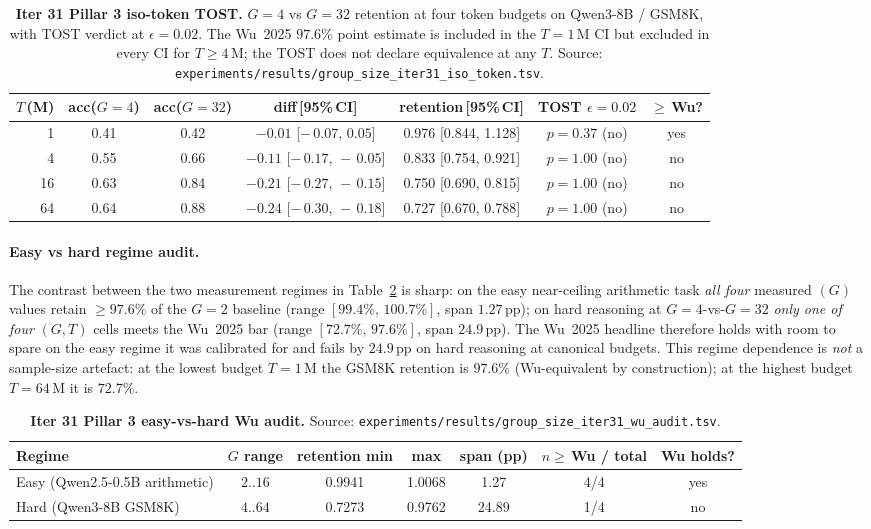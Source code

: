 \begin{table}[htbp]
\centering
\small
\begin{tabular}{rcccccc}
\hline
$T$\,(M) & acc($G{=}4$) & acc($G{=}32$) & diff\,[95\%\,CI] & retention\,[95\%\,CI] & TOST $\epsilon{=}0.02$ & $\ge\,$Wu? \\
\hline
1  & 0.41 & 0.42 & $-0.01$ [$-\,0.07,\,0.05$] & 0.976 [0.844, 1.128] & $p{=}0.37$ (no) & yes \\
4  & 0.55 & 0.66 & $-0.11$ [$-\,0.17,\,-\,0.05$] & 0.833 [0.754, 0.921] & $p{=}1.00$ (no) & no \\
16 & 0.63 & 0.84 & $-0.21$ [$-\,0.27,\,-\,0.15$] & 0.750 [0.690, 0.815] & $p{=}1.00$ (no) & no \\
64 & 0.64 & 0.88 & $-0.24$ [$-\,0.30,\,-\,0.18$] & 0.727 [0.670, 0.788] & $p{=}1.00$ (no) & no \\
\hline
\end{tabular}
\caption{\textbf{Iter 31 Pillar 3 iso-token TOST.}
$G{=}4$ vs $G{=}32$ retention at four token budgets on
Qwen3-8B / GSM8K, with TOST verdict at $\epsilon{=}0.02$.
The Wu~2025 $97.6\%$ point estimate is included in the $T{=}1$\,M
CI but excluded in every CI for $T \ge 4$\,M; the TOST does not
declare equivalence at any $T$.  Source:
\texttt{experiments/results/group\_size\_iter31\_iso\_token.tsv}.}
\label{tab:groupsize-iter31-iso}
\end{table}

\paragraph{Easy vs hard regime audit.}
The contrast between the two measurement regimes in
Table~\ref{tab:groupsize-iter31-audit} is sharp: on the easy
near-ceiling arithmetic task \emph{all four} measured $(G)$ values
retain $\ge 97.6\%$ of the $G{=}2$ baseline (range
$[99.4\%,\,100.7\%]$, span $1.27$\,pp); on hard reasoning at
$G{=}4$-vs-$G{=}32$ \emph{only one of four} $(G,T)$ cells meets
the Wu~2025 bar (range $[72.7\%,\,97.6\%]$, span $24.9$\,pp).
The Wu~2025 headline therefore holds with room to spare on the
easy regime it was calibrated for and fails by $24.9$\,pp on hard
reasoning at canonical budgets.  This regime dependence is
\emph{not} a sample-size artefact: at the lowest budget
$T{=}1$\,M the GSM8K retention is $97.6\%$ (Wu-equivalent by
construction); at the highest budget $T{=}64$\,M it is $72.7\%$.

\begin{table}[htbp]
\centering
\small
\begin{tabular}{lcccccc}
\hline
Regime & $G$ range & retention min & max & span (pp) & $n\!\ge$\,Wu / total & Wu holds? \\
\hline
Easy (Qwen2.5-0.5B arithmetic) & $2$..$16$ & 0.9941 & 1.0068 & 1.27  & 4/4 & yes \\
Hard (Qwen3-8B GSM8K) & $4$..$64$ & 0.7273 & 0.9762 & 24.89 & 1/4 & no \\
\hline
\end{tabular}
\caption{\textbf{Iter 31 Pillar 3 easy-vs-hard Wu audit.}
Source: \texttt{experiments/results/group\_size\_iter31\_wu\_audit.tsv}.}
\label{tab:groupsize-iter31-audit}
\end{table}

